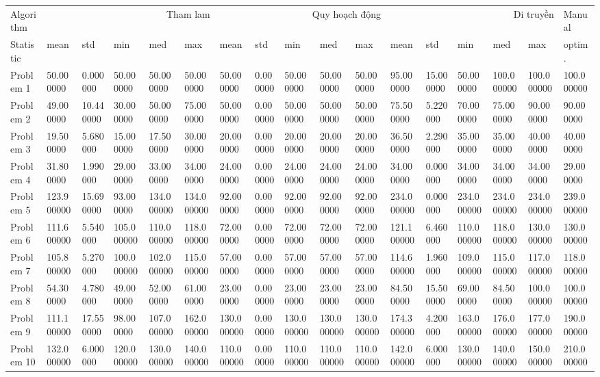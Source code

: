 \begin{tabular}{lllllllllllllllll}
\toprule
Algorithm & \multicolumn{5}{r}{Tham lam} & \multicolumn{5}{r}{Quy hoạch động} & \multicolumn{5}{r}{Di truyền} & Manual \\
Statistic & mean & std & min & med & max & mean & std & min & med & max & mean & std & min & med & max & optim. \\
\midrule
Problem 1 & 50.000000 & 0.000000 & 50.000000 & 50.000000 & 50.000000 & 50.000000 & 0.000000 & 50.000000 & 50.000000 & 50.000000 & 95.000000 & 15.000000 & 50.000000 & 100.000000 & 100.000000 & 100.000000 \\
Problem 2 & 49.000000 & 10.440000 & 30.000000 & 50.000000 & 75.000000 & 50.000000 & 0.000000 & 50.000000 & 50.000000 & 50.000000 & 75.500000 & 5.220000 & 70.000000 & 75.000000 & 90.000000 & 90.000000 \\
Problem 3 & 19.500000 & 5.680000 & 15.000000 & 17.500000 & 30.000000 & 20.000000 & 0.000000 & 20.000000 & 20.000000 & 20.000000 & 36.500000 & 2.290000 & 35.000000 & 35.000000 & 40.000000 & 40.000000 \\
Problem 4 & 31.800000 & 1.990000 & 29.000000 & 33.000000 & 34.000000 & 24.000000 & 0.000000 & 24.000000 & 24.000000 & 24.000000 & 34.000000 & 0.000000 & 34.000000 & 34.000000 & 34.000000 & 29.000000 \\
Problem 5 & 123.900000 & 15.690000 & 93.000000 & 134.000000 & 134.000000 & 92.000000 & 0.000000 & 92.000000 & 92.000000 & 92.000000 & 234.000000 & 0.000000 & 234.000000 & 234.000000 & 234.000000 & 239.000000 \\
Problem 6 & 111.600000 & 5.540000 & 105.000000 & 110.000000 & 118.000000 & 72.000000 & 0.000000 & 72.000000 & 72.000000 & 72.000000 & 121.100000 & 6.460000 & 110.000000 & 118.000000 & 130.000000 & 130.000000 \\
Problem 7 & 105.800000 & 5.270000 & 100.000000 & 102.000000 & 115.000000 & 57.000000 & 0.000000 & 57.000000 & 57.000000 & 57.000000 & 114.600000 & 1.960000 & 109.000000 & 115.000000 & 117.000000 & 118.000000 \\
Problem 8 & 54.300000 & 4.780000 & 49.000000 & 52.000000 & 61.000000 & 23.000000 & 0.000000 & 23.000000 & 23.000000 & 23.000000 & 84.500000 & 15.500000 & 69.000000 & 84.500000 & 100.000000 & 100.000000 \\
Problem 9 & 111.100000 & 17.550000 & 98.000000 & 107.000000 & 162.000000 & 130.000000 & 0.000000 & 130.000000 & 130.000000 & 130.000000 & 174.300000 & 4.200000 & 163.000000 & 176.000000 & 177.000000 & 190.000000 \\
Problem 10 & 132.000000 & 6.000000 & 120.000000 & 130.000000 & 140.000000 & 110.000000 & 0.000000 & 110.000000 & 110.000000 & 110.000000 & 142.000000 & 6.000000 & 130.000000 & 140.000000 & 150.000000 & 210.000000 \\
\bottomrule
\end{tabular}
